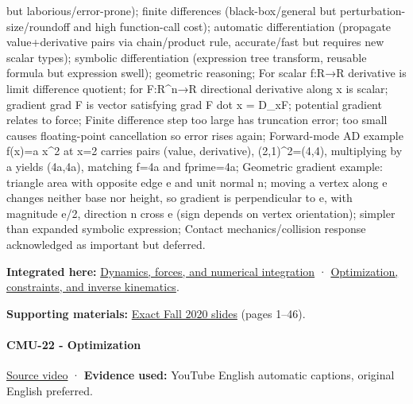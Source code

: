 but laborious/error-prone); finite differences (black-box/general but perturbation-size/roundoff and high function-call cost); automatic differentiation (propagate value+derivative pairs via chain/product rule, accurate/fast but requires new scalar types); symbolic differentiation (expression tree transform, reusable formula but expression swell); geometric reasoning; For scalar f:R→R derivative is limit difference quotient; for F:R\^{}n→R directional derivative along x is scalar; gradient grad F is vector satisfying grad F dot x = D\_xF; potential gradient relates to force; Finite difference step too large has truncation error; too small causes floating-point cancellation so error rises again; Forward-mode AD example f(x)=a x\^{}2 at x=2 carries pairs (value, derivative), (2,1)\^{}2=(4,4), multiplying by a yields (4a,4a), matching f=4a and fprime=4a; Geometric gradient example: triangle area with opposite edge e and unit normal n; moving a vertex along e changes neither base nor height, so gradient is perpendicular to e, with magnitude \textbar e\textbar/2, direction n cross e (sign depends on vertex orientation); simpler than expanded symbolic expression; Contact mechanics/collision response acknowledged as important but deferred.

\textbf{Integrated here:} \hyperref[04-visual-computing-ii-ch029]{Dynamics, forces, and numerical integration} · \hyperref[04-visual-computing-ii-ch029]{Optimization, constraints, and inverse kinematics}.

\textbf{Supporting materials:} \href{https://15462.courses.cs.cmu.edu/fall2020content/lectures/21_dynamicstimeintegration/21_dynamicstimeintegration_slides.pdf}{Exact Fall 2020 slides} (pages 1--46).

\paragraph{CMU-22 - Optimization}\label{cmu-22---optimization}

\href{https://www.youtube.com/watch?v=sDAEFFoiKZ0}{Source video} · \textbf{Evidence used:} YouTube English automatic captions, original English preferred.

